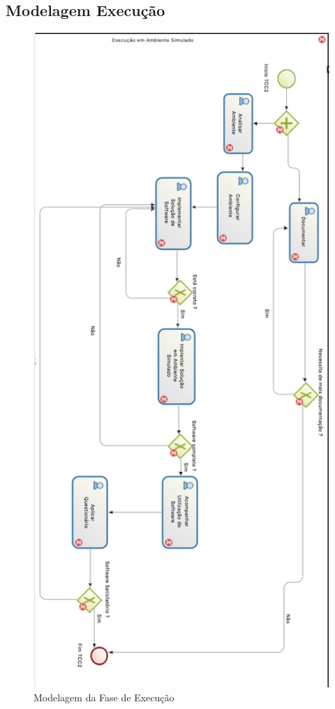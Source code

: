 \begin{apendicesenv}
\chapter{Modelagem Execução}
\graphicspath{{figuras/}}
\begin{figure}
\centering
\includegraphics[scale=0.80]{execucao}
\caption{Modelagem da Fase de Execução}
\label{img:execucao}
\end{figure}


\end{apendicesenv}
